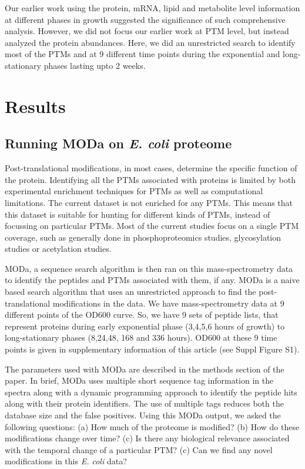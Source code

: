 \documentclass[12pt]{article}
\begin{document}
Our earlier work using the protein, mRNA, lipid and metabolite level information at different phases in growth suggested the significance of such comprehensive analysis. However, we did not focus our earlier work at PTM level, but instead analyzed the protein abundances. Here, we did an unrestricted search to identify most of the PTMs and at 9 different time points during the exponential and long-stationary phases lasting upto 2 weeks.

\section{Results}

\subsection{Running MODa on \emph{E. coli} proteome}
Post-translational modifications, in most cases, determine the specific function of the protein. Identifying all the PTMs associated with proteins is limited by both experimental enrichment techniques for PTMs as well as computational limitations. The current dataset is not enriched for any PTMs. This means that this dataset is suitable for hunting for different kinds of PTMs, instead of focussing on particular PTMs. Most of the current studies focus on a single PTM coverage, such as generally done in phosphoproteomics studies, glycosylation studies or acetylation studies. 

MODa, a sequence search algorithm is then ran on this mass-spectrometry data to identify the peptides and PTMs associated with them, if any. MODa is a naive based search algorithm that uses an unrestricted approach to find the post-translational modifications in the data. We have mass-spectrometry data at 9 different points of the OD600 curve. So, we have 9 sets of peptide lists, that represent proteins during early exponential phase (3,4,5,6 hours of growth) to long-stationary phases (8,24,48, 168 and 336 hours). OD600 at these 9 time points is given in supplementary information of this article (see Suppl Figure S1). 

The parameters used with MODa are described in the methods section of the paper. In brief, MODa uses multiple short sequence tag information in the spectra along with a dynamic programming approach to identify the peptide hits along with their protein identifiers. The use of multiple tags reduces both the database size and the false positives. Using this MODa output, we asked the following questions: (a) How much of the proteome is modified? (b) How do these modifications change over time? (c) Is there any biological relevance associated with the temporal change of a particular PTM? (c) Can we find any novel modifications in this \emph{E. coli} data? 
\end{document}
